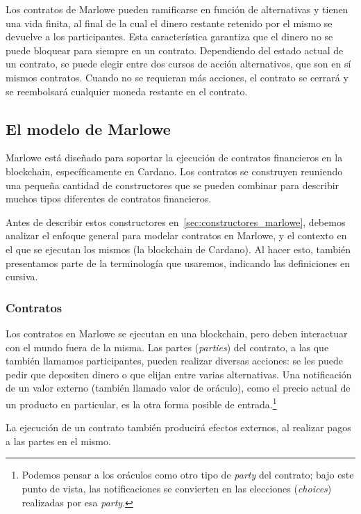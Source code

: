 \documentclass[12pt]{book}
\begin{document}
Los contratos de Marlowe pueden ramificarse en función de alternativas y tienen una vida finita, al final de la cual el dinero restante retenido por el mismo se devuelve a los participantes. Esta característica garantiza que el dinero no se puede bloquear para siempre en un contrato. Dependiendo del estado actual de un contrato, se puede elegir entre dos cursos de acción alternativos, que son en sí mismos contratos. Cuando no se requieran más acciones, el contrato se cerrará y se reembolsará cualquier moneda restante en el contrato.

\subsection{El modelo de Marlowe}\label{sec:Modelo_de_marlowe}

Marlowe está diseñado para soportar la ejecución de contratos financieros en la blockchain, específicamente en Cardano. Los contratos se construyen reuniendo una pequeña cantidad de constructores que se pueden combinar para describir muchos tipos diferentes de contratos financieros.

Antes de describir estos constructores en~\ref{sec:constructores_marlowe}, debemos analizar el enfoque general para modelar contratos en Marlowe, y el contexto en el que se ejecutan los mismos (la blockchain de Cardano). Al hacer esto, también presentamos parte de la terminología que usaremos, indicando las definiciones en cursiva.

\subsubsection{Contratos}
Los contratos en Marlowe se ejecutan en una blockchain, pero deben interactuar con el mundo fuera de la misma. Las partes (\textit{parties}) del contrato, a las que también llamamos participantes, pueden realizar diversas acciones: se les puede pedir que depositen dinero o que elijan entre varias alternativas. Una notificación de un valor externo (también llamado valor de oráculo), como el precio actual de un producto en particular, es la otra forma posible de entrada.\footnote{Podemos pensar a los oráculos como otro tipo de \textit{party} del contrato; bajo este punto de vista, las notificaciones se convierten en las elecciones (\textit{choices}) realizadas por esa \textit{party}.}

La ejecución de un contrato también producirá efectos externos, al realizar pagos a las partes en el mismo.
\end{document}
